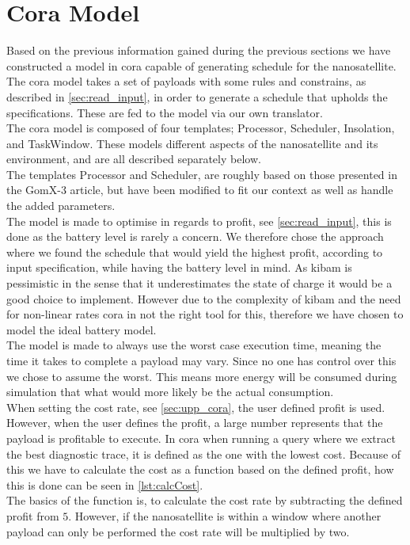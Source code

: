 \section{Cora Model} \label{sec:cora}
Based on the previous information gained during the previous sections we have constructed a model in \gls{cora} capable of generating schedule for the nanosatellite. The \gls{cora} model takes a set of payloads with some rules and constrains, as described in \cref{sec:read_input}, in order to generate a schedule that upholds the specifications. These are fed to the model via our own translator.\\
The \gls{cora} model is composed of four templates; Processor, Scheduler, Insolation, and TaskWindow. These models different aspects of the nanosatellite and its environment, and are all described separately below.\\
The templates Processor and Scheduler, are roughly based on those presented in the GomX-3 article\cite{gomx3}, but have been modified to fit our context as well as handle the added parameters.\\
The model is made to optimise in regards to profit, see \cref{sec:read_input}, this is done as the battery level is rarely a concern\cite{gom_space_conversation}. We therefore chose the approach where we found the schedule that would yield the highest profit, according to input specification, while having the battery level in mind. As \gls{kibam} is pessimistic in the sense that it underestimates the state of charge it would be a good choice to implement. However due to the complexity of \gls{kibam} and the need for non-linear rates \gls{cora} in not the right tool for this, therefore we have chosen to model the ideal battery model.\\
The model is made to always use the worst case execution time, meaning the time it takes to complete a payload may vary. Since no one has control over this we chose to assume the worst. This means more energy will be consumed during simulation that what would more likely be the actual consumption.\\
When setting the cost rate, see \cref{sec:upp_cora}, the user defined profit is used. However, when the user defines the profit, a large number represents that the payload is profitable to execute. In \gls{cora} when running a query where we extract the best diagnostic trace, it is defined as the one with the lowest cost. Because of this we have to calculate the cost as a function based on the defined profit, how this is done can be seen in \cref{lst:calcCost}.\\
The basics of the function  is, to calculate the cost rate by subtracting the defined profit from $5$. However, if the nanosatellite is within a window where another payload can only be performed the cost rate will be multiplied by two.\\


